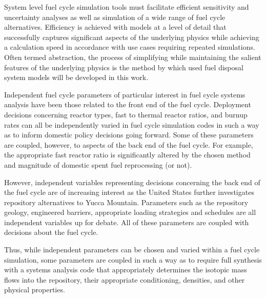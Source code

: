 
System level fuel cycle simulation tools must facilitate efficient sensitivity 
and uncertainty analyses as well as simulation of a wide range of fuel cycle 
alternatives.  Efficiency is achieved with models at a level of detail that 
successfully captures significant aspects of the underlying physics while 
achieving a calculation speed in accordance with use cases requiring repeated 
simulations. Often termed abstraction, the process of simplifying while 
maintaining the salient features of the underlying physics is the method by 
which used fuel disposal system models will be developed in this work. 


Independent fuel cycle parameters of particular interest in fuel cycle systems 
analysis have been those related to the front end of the fuel cycle. Deployment 
decisions concerning reactor types, fast to thermal reactor ratios, and burnup 
rates can all be independently varied in fuel cycle simulation codes in such a 
way as to inform domestic policy decisions going forward. Some of these 
parameters are coupled, however, to aspects of the back end of the fuel cycle.  
For example, the appropriate fast reactor ratio is significantly altered by the 
chosen method and magnitude of domestic spent fuel reprocessing (or not).


However, independent variables representing decisions concerning the back end
of the fuel cycle are of increasing interest as the United States further
investigates repository alternatives to Yucca Mountain.  Parameters such as the
repository geology, engineered barriers, appropriate loading strategies and
schedules are all independent variables up for debate. All of these
parameters are coupled with decisions about the fuel cycle. 


Thus, while independent parameters can be chosen and varied
within a fuel cycle simulation, some parameters are coupled in such a way as to
require full synthesis with a systems analysis code that appropriately
determines the isotopic mass flows into the repository, their appropriate
conditioning, densities, and other physical properties.  

